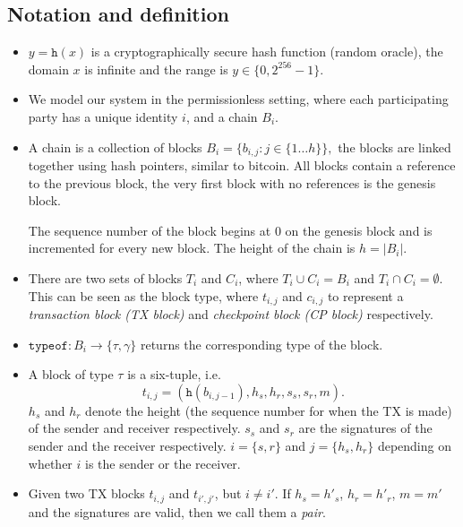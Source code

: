 \subsection{Notation and definition}
\begin{itemize}

\item $y = \texttt{h}(x)$ is a cryptographically secure hash function (random
  oracle), the domain $x$ is infinite and the range is $y \in \{0, 2^{256}-1\}$.

\item We model our system in the permissionless setting, where each
  participating party has a unique identity $i$, and a chain $B_i$.

\item A chain is a collection of blocks
  $B_i = \{b_{i,j} : j \in \{1 \dots h\} \},$
  the blocks are linked together using hash pointers, similar to bitcoin. All
  blocks contain a reference to the previous block, the very first block with no
  references is the genesis block.

  The sequence number of the block begins at 0 on the genesis block and is
  incremented for every new block. The height of the chain is $h = |B_i|$.

\item There are two sets of blocks $T_i$ and $C_i$, where $T_i \cup
  C_i = B_i$ and $T_i \cap C_i = \emptyset$. This can be seen as the
  block type, where $t_{i,j}$ and $c_{i,j}$ to represent a
  \emph{transaction block (TX block)} and \emph{checkpoint block (CP block)}
  respectively.

\item $\texttt{typeof}: B_i \rightarrow \{ \tau, \gamma \}$ returns the
  corresponding type of the block.

\item A block of type $\tau$ is a six-tuple, i.e. $$t_{i,j} =
  (\texttt{h}(b_{i,j-1}), h_s, h_r, s_s, s_r, m).$$ $h_s$ and $h_r$ denote the
  height (the sequence number for when the TX is made) of the sender and
  receiver respectively. $s_s$ and $s_r$ are the signatures of the sender and
  the receiver respectively. $i = \{s, r\}$ and $j = \{h_s, h_r\}$ depending on
  whether $i$ is the sender or the receiver.

\item Given two TX blocks $t_{i,j}$ and $t_{i',j'}$, but $i \neq i'$. If $h_s =
  h'_s$, $h_r = h'_r$, $m = m'$ and the signatures are valid, then we call them
  a \emph{pair}.


\end{itemize}
